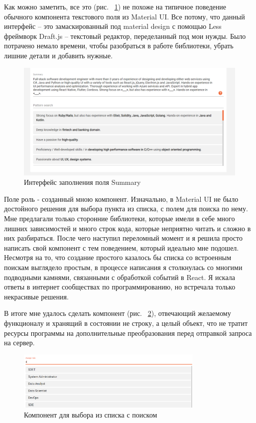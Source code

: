 \documentclass[a4paper,12pt]{diplom}
\begin{document}
Как можно заметить, все это (рис. ~\ref{7}) не похоже на типичное поведение обычного компонента текстового поля из Material UI. Все потому, что данный интерфейс -- это
замаскированный под material design с помощью Less фреймворк Draft.js -- текстовый редактор, переделанный под мои нужды. Было потрачено немало времени, чтобы разобраться в работе библиотеки,
убрать лишние детали и добавить нужные.

\begin{figure}[!ht]
	\centering
	\includegraphics[width=1\textwidth]{resources/summary.png}
	\caption{Интерфейс заполнения поля Summary}
	\label{7}
\end{figure}

Поле роль - созданный мною компонент. Изначально, в Material UI не было достойного решения для выбора пункта из списка, с полем для поиска по нему.
Мне предлагали только сторонние библиотеки, которые имели в себе много лишних зависимостей и много строк кода, которые неприятно читать и сложно в них разбираться.
После чего наступил переломный момент и я решила просто написать свой компонент с тем поведением, который идеально мне подошел. Несмотря на то, что создание простого казалось бы списка со встроенным поискам выглядело простым, 
в процессе написания я столкнулась со многими подводными камнями, связанными с обработкой событий в React. Я искала ответы в интернет сообществах по программированию,
но встречала только некрасивые решения. 

В итоге мне удалось сделать компонент (рис. ~\ref{8}), отвечающий желаемому функционалу и хранящий в состоянии не строку, а целый объект, что
не тратит ресурсы программы на дополнительные преобразования перед отправкой запроса на сервер.

\begin{figure}[!ht]
	\centering
	\includegraphics[width=0.8\textwidth]{resources/role.png}
	\caption{Компонент для выбора из списка с поиском}
	\label{8}
\end{figure}
\end{document}
